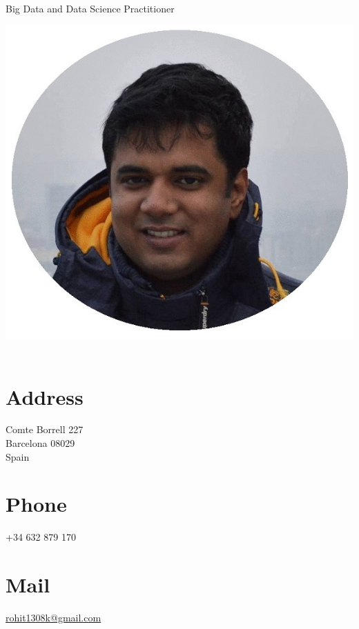 \documentclass[]{cv-class}
\begin{document}
      {Big Data and Data Science Practitioner}

\vspace{1.15cm}

\begin{aside}
  \includegraphics[scale=0.30]{img/meg2.jpg}
    ~
  \vspace{0.65cm}
  \section{Address}
    Comte Borrell 227\\
    Barcelona 08029\\
    Spain
    ~
  \section{Phone}
    +34 632 879 170
    ~
  \section{Mail}
    \underline{\href{mailto:rohit1308k@gmail.com}{rohit1308k@gmail.com}}
    ~

\end{aside}
\end{document}
